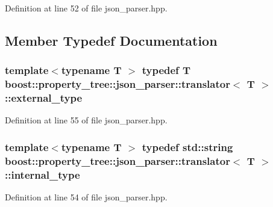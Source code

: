 Definition at line 52 of file json\-\_\-parser.\-hpp.



\subsection{Member Typedef Documentation}
\hypertarget{structboost_1_1property__tree_1_1json__parser_1_1translator_a41e329b10777c2a4a756b65911746a8a}{
\subsubsection[{external\-\_\-type}]{\setlength{\rightskip}{0pt plus 5cm}template$<$typename T $>$ typedef T {\bf boost\-::property\-\_\-tree\-::json\-\_\-parser\-::translator}$<$ T $>$\-::{\bf external\-\_\-type}}}\label{structboost_1_1property__tree_1_1json__parser_1_1translator_a41e329b10777c2a4a756b65911746a8a}


Definition at line 55 of file json\-\_\-parser.\-hpp.

\hypertarget{structboost_1_1property__tree_1_1json__parser_1_1translator_aa6939259165594c66343c4fd2b92fee0}{
\subsubsection[{internal\-\_\-type}]{\setlength{\rightskip}{0pt plus 5cm}template$<$typename T $>$ typedef std\-::string {\bf boost\-::property\-\_\-tree\-::json\-\_\-parser\-::translator}$<$ T $>$\-::{\bf internal\-\_\-type}}}\label{structboost_1_1property__tree_1_1json__parser_1_1translator_aa6939259165594c66343c4fd2b92fee0}


Definition at line 54 of file json\-\_\-parser.\-hpp.



